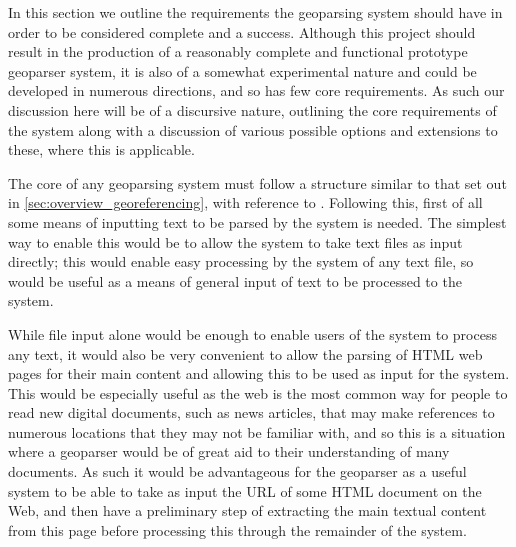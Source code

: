 \documentclass[12pt, a4paper]{report}
\begin{document}
In this section we outline the requirements the geoparsing system should have in order to be considered complete and a success. Although this project should result in the production of a reasonably complete and functional prototype geoparser system, it is also of a somewhat experimental nature and could be developed in numerous directions, and so has few core requirements. As such our discussion here will be of a discursive nature, outlining the core requirements of the system along with a discussion of various possible options and extensions to these, where this is applicable. 



The core of any geoparsing system must follow a structure similar to that set out in \ref{sec:overview_georeferencing}, with reference to \citet{hill2006}. Following this, first of all some means of inputting text to be parsed by the system is needed. The simplest way to enable this would be to allow the system to take text files as input directly; this would enable easy processing by the system of any text file, so would be useful as a means of general input of text to be processed to the system.

While file input alone would be enough to enable users of the system to process any text, it would also be very convenient to allow the parsing of HTML web pages for their main content and allowing this to be used as input for the system. This would be especially useful as the web is the most common way for people to read new digital documents, such as news articles, that may make references to numerous locations that they may not be familiar with, and so this is a situation where a geoparser would be of great aid to their understanding of many documents. As such it would be advantageous for the geoparser as a useful system to be able to take as input the URL of some HTML document on the Web, and then have a preliminary step of extracting the main textual content from this page before processing this through the remainder of the system.
\end{document}
